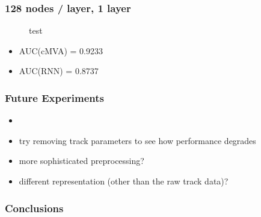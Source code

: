 \documentclass{beamer}
\begin{document}
\begin{frame}
  \frametitle{128 nodes / layer, 1 layer}

  \begin{figure}[htb]
    \centering

    \caption{test}
  \end{figure}

  \begin{itemize}
  \item AUC(cMVA) = 0.9233
  \item AUC(RNN) = 0.8737
  \end{itemize}

\end{frame}


\begin{frame}
  \frametitle{Future Experiments}

  \begin{itemize}
    \item 
    \item try removing track parameters to see how performance degrades
    \item more sophisticated preprocessing?
    \item different representation (other than the raw track data)?
  \end{itemize}
\end{frame}

\begin{frame}
  \frametitle{Conclusions}
\end{frame}
 
\end{document}

